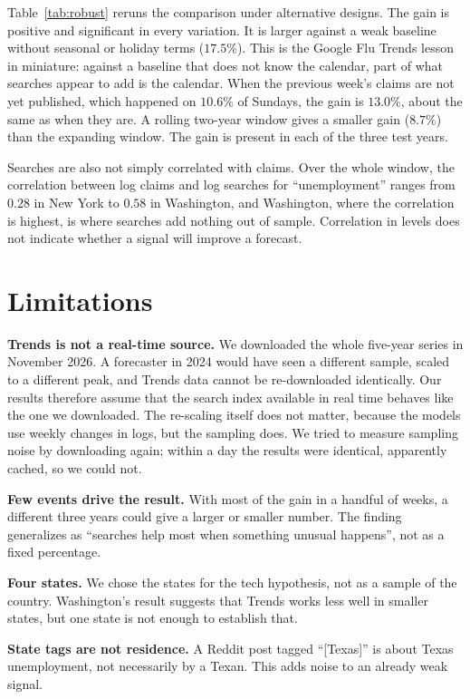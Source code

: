 \documentclass[sigconf,nonacm]{acmart}
\begin{document}
Table~\ref{tab:robust} reruns the comparison under alternative designs. The gain is positive
and significant in every variation. It is larger against a weak baseline without seasonal
or holiday terms ($17.5\%$). This is the Google Flu Trends lesson in miniature: against a
baseline that does not know the calendar, part of what searches appear to add is the
calendar. When the previous week's claims are not yet published, which happened on $10.6\%$
of Sundays, the gain is $13.0\%$, about the same as when they are. A rolling two-year
window gives a smaller gain ($8.7\%$) than the expanding window. The gain is present in each
of the three test years.

Searches are also not simply correlated with claims. Over the whole window, the correlation
between log claims and log searches for ``unemployment'' ranges from $0.28$ in New York to
$0.58$ in Washington, and Washington, where the correlation is highest, is where searches
add nothing out of sample. Correlation in levels does not indicate whether a signal will
improve a forecast.

\section{Limitations}

\textbf{Trends is not a real-time source.} We downloaded the whole five-year series in
November 2026. A forecaster in 2024 would have seen a different sample, scaled to a
different peak, and Trends data cannot be re-downloaded identically. Our results therefore
assume that the search index available in real time behaves like the one we downloaded. The
re-scaling itself does not matter, because the models use weekly changes in logs, but the
sampling does. We tried to measure sampling noise by downloading again; within a day the
results were identical, apparently cached, so we could not.

\textbf{Few events drive the result.} With most of the gain in a handful of weeks, a
different three years could give a larger or smaller number. The finding generalizes as
``searches help most when something unusual happens'', not as a fixed percentage.

\textbf{Four states.} We chose the states for the tech hypothesis, not as a sample of the
country. Washington's result suggests that Trends works less well in smaller states, but
one state is not enough to establish that.

\textbf{State tags are not residence.} A Reddit post tagged ``[Texas]'' is about Texas
unemployment, not necessarily by a Texan. This adds noise to an already weak signal.
\end{document}
